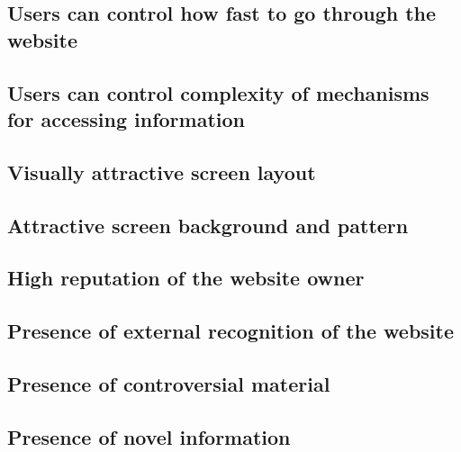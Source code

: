         \subsection{Users can control how fast to go through the website}

        \subsection{Users can control complexity of mechanisms for accessing information}

        \subsection{Visually attractive screen layout}

        \subsection{Attractive screen background and pattern}

        \subsection{High reputation of the website owner}

        \subsection{Presence of external recognition of the website}

        \subsection{Presence of controversial material}

        \subsection{Presence of novel information}
